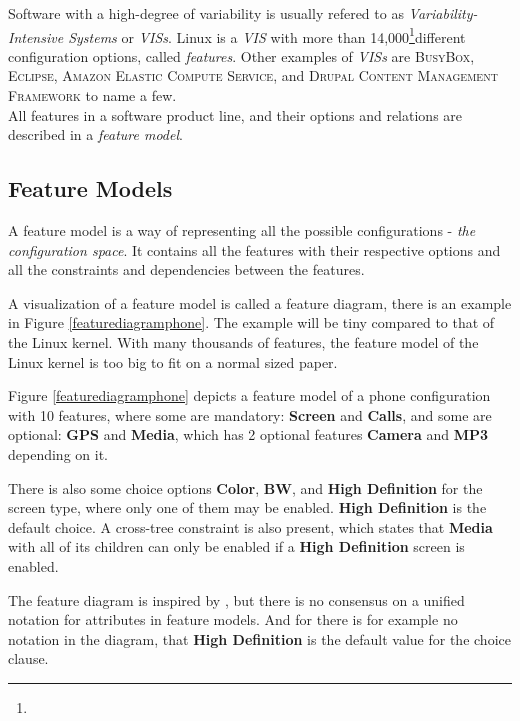 \documentclass[a4paper,11pt]{report}
\newcommand{\f}{\footnote{\fn}}
\begin{document}
Software with a high-degree of variability is usually refered to as 
\emph{Variability-Intensive Systems} or \emph{VISs}. Linux is a \emph{VIS} with 
more than 14,000\f different configuration options, called \emph{features}.
Other examples of \emph{VISs} are \textsc{BusyBox}, \textsc{Eclipse}, 
\textsc{Amazon Elastic Compute Service}, and \textsc{Drupal Content Management 
Framework}\cite[p. 1]{VarTesDrupal} to name a few.
\\

All features in a software product line, and their options and relations are 
described in a \emph{feature model}.

            \subsection{Feature Models}

A feature model is a way of representing all the possible configurations - 
\emph{the configuration space}. It contains all the features with their 
respective options and all the constraints and dependencies between the features.

A visualization of a feature model is called a feature diagram, there is an 
example in Figure \ref{featurediagramphone}. The example will be tiny compared 
to that of the Linux kernel. With many thousands of features, the feature model 
of the Linux kernel is too big to fit on a normal sized paper.

Figure \ref{featurediagramphone} depicts a feature model of a phone 
configuration with 10 features, where some are mandatory: \textbf{Screen} and 
\textbf{Calls}, and some are optional: \textbf{GPS} and \textbf{Media}, which has 2
optional features \textbf{Camera} and \textbf{MP3} depending on it.

There is also some choice options \textbf{Color}, \textbf{BW}, and \textbf{High 
Definition} for the screen type, where only one of them may be enabled. 
\textbf{High Definition} is the default choice. A 
cross-tree constraint is also present, which states that \textbf{Media} with 
all of its children can only be enabled if a \textbf{High Definition} screen is 
enabled.

The feature diagram is inspired by \cite{AAFM}, but there is no consensus on a 
unified notation for attributes in feature models\cite{AAFM}. And for there is 
for example no notation in the diagram, that \textbf{High Definition} is the 
default value for the choice clause.
\end{document}
